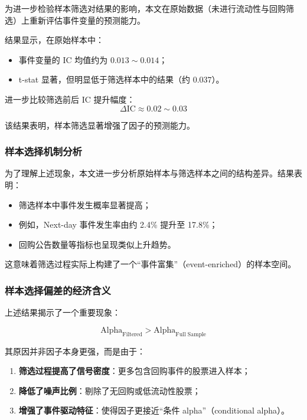 \documentclass[a4paper,10pt]{article}
\begin{document}
为进一步检验样本筛选对结果的影响，本文在原始数据（未进行流动性与回购筛选）上重新评估事件变量的预测能力。

结果显示，在原始样本中：

\begin{itemize}
    \item 事件变量的 IC 均值约为 $0.013 \sim 0.014$；
    \item t-stat 显著，但明显低于筛选样本中的结果（约 $0.037$）。
\end{itemize}

进一步比较筛选前后 IC 提升幅度：
\begin{equation}
\Delta \text{IC} \approx 0.02 \sim 0.03
\end{equation}

该结果表明，样本筛选显著增强了因子的预测能力。

\subsubsection{样本选择机制分析}

为了理解上述现象，本文进一步分析原始样本与筛选样本之间的结构差异。结果表明：

\begin{itemize}
    \item 筛选样本中事件发生概率显著提高；
    \item 例如，Next-day 事件发生率由约 2.4\% 提升至 17.8\%；
    \item 回购公告数量等指标也呈现类似上升趋势。
\end{itemize}

这意味着筛选过程实际上构建了一个“事件富集”（event-enriched）的样本空间。

\subsubsection{样本选择偏差的经济含义}

上述结果揭示了一个重要现象：

\begin{equation}
\text{Alpha}_{\text{Filtered}} > \text{Alpha}_{\text{Full Sample}}
\end{equation}

其原因并非因子本身更强，而是由于：

\begin{enumerate}
    \item \textbf{筛选过程提高了信号密度}：更多包含回购事件的股票进入样本；
    
    \item \textbf{降低了噪声比例}：剔除了无回购或低流动性股票；
    
    \item \textbf{增强了事件驱动特征}：使得因子更接近“条件 alpha”（conditional alpha）。
\end{enumerate}
\end{document}
